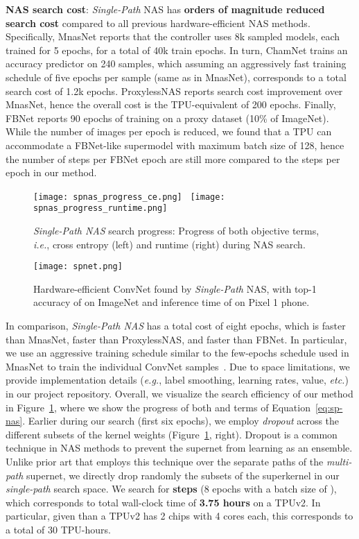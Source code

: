 \documentclass[runningheads]{llncs}
\begin{document}
\textbf{NAS search cost}: \textit{Single-Path} NAS has \textbf{orders of magnitude 
reduced search cost} compared to all previous hardware-efficient NAS methods.
Specifically, MnasNet reports that the controller uses 8k sampled models, each 
trained for 5 epochs, for a total of 40k train epochs. In turn, ChamNet
trains an accuracy predictor on 240 samples, which assuming an aggressively 
fast training schedule of five epochs per sample (same as in MnasNet),
corresponds to a total search cost of 1.2k epochs.
ProxylessNAS reports  search cost improvement over MnasNet,
hence the overall cost is the TPU-equivalent of 200 epochs. 
Finally, FBNet reports 90 epochs of training on a proxy dataset (10\%
of ImageNet). While the number of images per epoch is reduced, we found
that a TPU can accommodate a FBNet-like supermodel with maximum batch size
of 128, hence the number of steps per FBNet epoch are still 
more compared to the steps per epoch in our method.


\begin{figure}[h!]
  \centering
  \texttt{[image: spnas\_progress\_ce.png]}~
  \texttt{[image: spnas\_progress\_runtime.png]}
  \caption{\textit{Single-Path NAS} search progress: Progress of both objective terms, 
  \textit{i.e.}, cross entropy  (left) and runtime  (right) during NAS search.}
  \label{fig:progress}
\end{figure}

\begin{figure}[t]
  \centering
  \texttt{[image: spnet.png]}
  \caption{Hardware-efficient ConvNet found by \textit{Single-Path} NAS, with 
  top-1 accuracy of  on ImageNet and inference time of  
  on Pixel 1 phone.}
  \label{fig:spnet}
\end{figure}

In comparison, \textit{Single-Path NAS} has a total cost of eight epochs, which 
is  faster than MnasNet,  faster than ProxylessNAS, 
and  faster than FBNet. In particular, we use an aggressive 
training schedule similar to the few-epochs schedule used in MnasNet to 
train the individual ConvNet samples~\cite{tan2018mnasnet}. Due to space 
limitations, we provide implementation details (\textit{e.g.}, label smoothing, learning rates,
 value, \textit{etc.}) in our project repository. Overall, we visualize the search 
efficiency of 
our method in Figure~\ref{fig:progress}, where we show the progress of both 
 and  terms of Equation~\ref{eq:sp-nas}. Earlier during our search (first six epochs), 
we employ \textit{dropout} across the different subsets of the kernel weights
(Figure~\ref{fig:progress}, right).
Dropout is a common technique in NAS methods to prevent the supernet from 
learning as an ensemble. Unlike prior art that employs this technique over 
the separate paths of the \textit{multi-path} supernet, we directly 
drop randomly the subsets of the superkernel in our
\textit{single-path} search space. 
We search for \textbf{ steps} (8 epochs with a batch size of ),
which corresponds to total wall-clock time of \textbf{3.75 hours} on a TPUv2.
In particular, given than a TPUv2 has 2 chips with 4 cores each, this 
corresponds to a total of 30 TPU-hours. 
\end{document}
